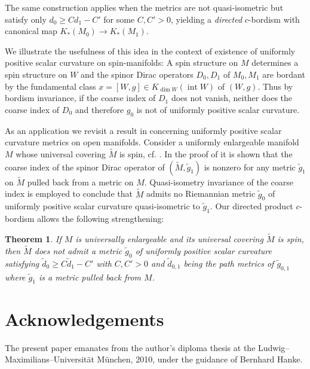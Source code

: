 \documentclass[a4paper]{amsproc}
\newtheorem{theorem}{Theorem}[section]
\theoremstyle{definition}
\theoremstyle{remark}
\numberwithin{equation}{section}
\begin{document}
The same construction applies when the metrics are not quasi-isometric but satisfy only $d_0\geq Cd_1-C'$ for some $C,C'>0$, yielding a
\emph{directed} $c$-bordism with canonical map $K_*(M_0)\to K_*(M_1)$.

We illustrate the usefulness of this idea in the context of existence of uniformly positive scalar curvature on spin-manifolds: A spin structure on $M$ determines a spin structure on $W$ and the spinor Dirac operators $D_0,D_1$ of $M_0,M_1$ are bordant by the
fundamental class $x=[W,g]\in K_{\dim W}(\operatorname{int} W)$ of $(W,g)$. Thus by bordism invariance, if the coarse index of $D_1$ does not vanish, neither does the coarse index of $D_0$ and therefore $g_0$ is not of uniformly positive scalar curvature.

As an application we revisit a result in \cite{MR2482205} concerning uniformly positive scalar curvature metrics on open manifolds. Consider a uniformly enlargeable manifold $M$ whose universal covering $\tilde M$ is spin, cf. \cite[Section 1]{MR2482205}.
In the proof of \cite[Corollary 1.8]{MR2482205} it is shown that the coarse index of the spinor Dirac operator of $(\tilde M,\tilde g_1)$ is nonzero for any metric $\tilde g_1$ on $\tilde M$ pulled back from a metric on $M$. Quasi-isometry invariance of the coarse index is employed to conclude that $\tilde M$ admits no Riemannian metric $\tilde g_0$ of uniformly positive scalar curvature quasi-isometric to $\tilde g_1$. Our directed product $c$-bordism allows the following strengthening:

\begin{theorem}\label{strengthening}
If $M$ is universally enlargeable and its universal covering $\tilde M$ is spin,
then $\tilde M$ does not admit a metric $\tilde g_0$ of uniformly positive scalar
curvature satisfying $\tilde d_0\geq C\tilde d_1-C'$ with $C,C'>0$ and $\tilde d_{0,1}$ being the path metrics of $\tilde g_{0,1}$ where $\tilde g_1$ is a metric pulled back from $M$.
\end{theorem}

\section*{Acknowledgements}
The present paper emanates from the author's diploma thesis at the Ludwig--Maximilians--Universit\"{a}t M\"{u}nchen, 2010, under the guidance of Bernhard Hanke.
\end{document}
